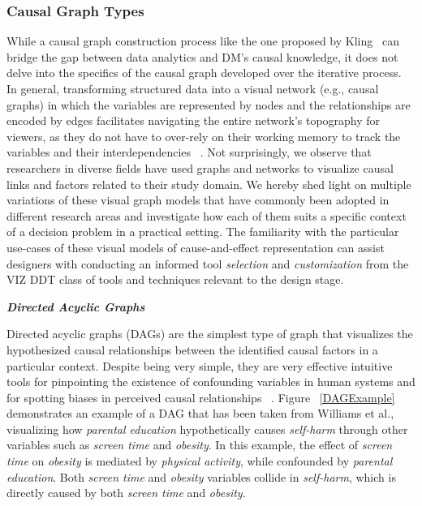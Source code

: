 \documentclass{sfuthesis}
\begin{document}
\subsubsection{Causal Graph Types}
While a causal graph construction process like the one proposed by Kling~\cite{kling2025co} can bridge the gap between data analytics and DM's causal knowledge, it does not delve into the specifics of the causal graph developed over the iterative process. In general, transforming structured data into a visual network (e.g., causal graphs) in which the variables are represented by nodes and the relationships are encoded by edges facilitates navigating the entire network's topography for viewers, as they do not have to over-rely on their working memory to track the variables and their interdependencies ~\cite{munzner_visualization_2015}.
Not surprisingly, we observe that researchers in diverse fields have used graphs and networks to visualize causal links and factors related to their study domain. We hereby shed light on multiple variations of these visual graph models that have commonly been adopted in different research areas and investigate how each of them suits a specific context of a decision problem in a practical setting. The familiarity with the particular use-cases of these visual models of cause-and-effect representation can assist designers with conducting an informed tool \textit{selection} and \textit{customization} from the VIZ DDT class of tools and techniques relevant to the design stage.\par
\noindent \textit{\textbf{Directed Acyclic Graphs}}\par
Directed acyclic graphs (DAGs) are the simplest type of graph that visualizes the hypothesized causal relationships between the identified causal factors in a particular context. Despite being very simple, they are very effective intuitive tools for pinpointing the existence of confounding variables in human systems and for spotting biases in perceived causal relationships ~\cite{shrier_reducing_2008,williams_directed_2018,digitale_tutorial_2022}. Figure ~\ref{DAGExample} demonstrates an example of a DAG that has been taken from Williams et al.\cite{williams_directed_2018}, visualizing how \textit{parental education} hypothetically causes \textit{self-harm} through other variables such as \textit{screen time} and \textit{obesity}. In this example, the effect of \textit{screen time} on \textit{obesity} is mediated by \textit{physical activity}, while confounded by \textit{parental education}. Both \textit{screen time} and \textit{obesity} variables collide in \textit{self-harm}, which is directly caused by both \textit{screen time} and \textit{obesity}.\par
\end{document}
